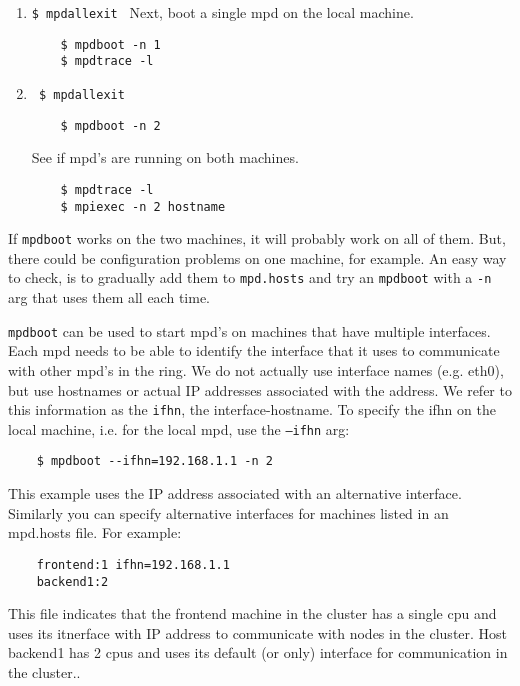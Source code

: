 \documentclass[dvipdfm,11pt]{article}
\begin{document}
\begin{enumerate}

\item  \verb+$ mpdallexit +
Next, boot a single mpd on the local machine.
\begin{verbatim}
    $ mpdboot -n 1
    $ mpdtrace -l
\end{verbatim}

\item \verb+ $ mpdallexit +
\begin{verbatim}
    $ mpdboot -n 2    
\end{verbatim}
See if mpd's are running on both machines.
\begin{verbatim}
    $ mpdtrace -l
    $ mpiexec -n 2 hostname
\end{verbatim}

\end{enumerate}

If \texttt{mpdboot} works on the two machines, it will probably work on
all of them.  But, there could be configuration problems on one machine,
for example.  An easy way to check, is to gradually add them to
\texttt{mpd.hosts} and try an \texttt{mpdboot} with a \texttt{-n} arg
that uses them all each time.

\texttt{mpdboot} can be used to start mpd's on machines that have multiple
interfaces.  Each mpd needs to be able to identify the interface that it uses
to communicate with other mpd's in the ring.  We do not actually use interface
names (e.g. eth0), but use hostnames or actual IP addresses associated with
the address.  We refer to this information as the \texttt{ifhn}, the
interface-hostname.  To specify the ifhn on the local machine, i.e. for the
local mpd, use the \texttt{--ifhn} arg:
\begin{verbatim}
    $ mpdboot --ifhn=192.168.1.1 -n 2
\end{verbatim}
This example uses the IP address associated with an alternative interface.
Similarly you can specify alternative interfaces for machines listed in an
mpd.hosts file.  For example:
\begin{verbatim}
    frontend:1 ifhn=192.168.1.1
    backend1:2
\end{verbatim}
This file indicates that the frontend machine in the cluster has a single 
cpu and uses its itnerface with IP address to communicate with nodes in the
cluster.  Host backend1 has 2 cpus and uses its default (or only) interface
for communication in the cluster..
\end{document}
